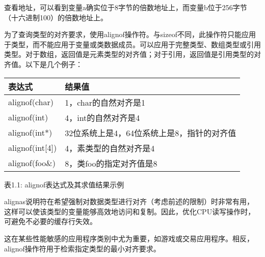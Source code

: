 查看地址，可以看到变量a确实位于8字节的倍数地址上，而变量b位于256字节（十六进制100）的倍数地址上。

为了查询类型的对齐要求，使用alignof操作符。与sizeof不同，此操作符只能应用于类型，而不能应用于变量或类数据成员。可以应用于完整类型、数组类型或引用类型。对于数组，返回值是元素类型的对齐值；对于引用，返回值是引用类型的对齐值。以下是几个例子：

\begin{longtable}{|l|l|}
\hline
\textbf{表达式} & \textbf{结果值}                                       \\ \hline
\endfirsthead
%
\endhead
%
alignof(char)       & 1，char的自然对齐是1             \\ \hline
alignof(int)        & 4，int的自然对齐是4              \\ \hline
alignof(int*)       & 32位系统上是4，64位系统上是8，指针的对齐值   \\ \hline
alignof(int{[}4{]}) & 4，素类型的自然对齐是4 \\ \hline
alignof(foo\&) & 8，类foo的指定对齐值是8 \\ \hline
\end{longtable}

\begin{center}
表1.1: alignof表达式及其求值结果示例
\end{center}

alignas说明符在希望强制对数据类型进行对齐（考虑前述的限制）时非常有用，这样可以使该类型的变量能够高效地访问和复制。因此，优化CPU读写操作时，可避免不必要的缓存行失效。

这在某些性能敏感的应用程序类别中尤为重要，如游戏或交易应用程序。相反，alignof操作符用于检索指定类型的最小对齐要求。








